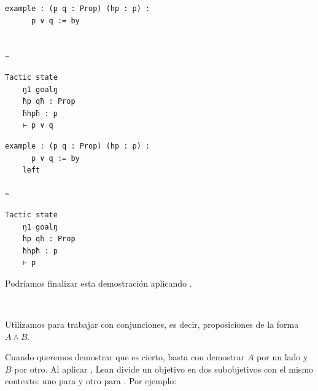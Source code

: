 \begin{minipage}[t]{0.58\textwidth}
\begin{lstlisting}[language=lean]
  example : (p q : Prop) (hp : p) :
      p ∨ q := by


~
\end{lstlisting}
\end{minipage}%
\hfill
\begin{minipage}[t]{0.40\textwidth}
\begin{lstlisting}[language=infoview]
  Tactic state
    ŋ1 goalŋ
    ħp qħ : Prop
    ħhpħ : p
    ⊢ p ∨ q
\end{lstlisting}
\end{minipage}
%
\noindent
\makebox[\textwidth]{$\downarrow$}
%
\begin{minipage}[t]{0.58\textwidth}
\begin{lstlisting}[language=lean]
  example : (p q : Prop) (hp : p) :
      p ∨ q := by
    left

~
\end{lstlisting}
\end{minipage}%
\hfill
\begin{minipage}[t]{0.40\textwidth}
\begin{lstlisting}[language=infoview]
  Tactic state
    ŋ1 goalŋ
    ħp qħ : Prop
    ħhpħ : p
    ⊢ p
\end{lstlisting}
\end{minipage}

Podríamos finalizar esta demostración aplicando .

\vspace{1em}
\noindent\textbf{$~$ }

Utilizamos  para trabajar con conjunciones, es decir, proposiciones de la forma $A \land B$.

Cuando queremos demostrar  que  es cierto, basta con demostrar $A$ por un lado y $B$ por otro. Al aplicar , Lean divide un objetivo  en dos subobjetivos con el mismo contexto: uno para  y otro para . Por ejemplo:

